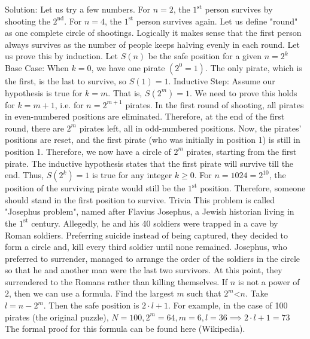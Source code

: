 \begin{enumerate}
Solution: Let us try a few numbers.
For $n=2$, the $1^{\text{st}}$ person survives by shooting the $2^{\text{nd}}$.
For $n=4$, the $1^{\text{st}}$ person survives again.
Let us define "round" as one complete circle of shootings. Logically it makes sense that the first person always survives as the number of people keeps halving evenly in each round. Let us prove this by induction.
Let $S(n)$ be the safe position for a given $n = 2^{k}$
Base Case: When $k = 0$, we have one pirate $(2^0 = 1)$. The only pirate, which is the first, is the last to survive, so $S(1) = 1$.
Inductive Step: Assume our hypothesis is true for $k = m$. That is, $S(2^m) = 1$.
We need to prove this holds for $k = m + 1$, i.e. for $n=2^{m+1}$ pirates.
In the first round of shooting, all pirates in even-numbered positions are eliminated. Therefore, at the end of the first round, there are $2^m$ pirates left, all in odd-numbered positions.
Now, the pirates' positions are reset, and the first pirate (who was initially in position 1) is still in position 1.
Therefore, we now have a circle of $2^m$ pirates, starting from the first pirate. The inductive hypothesis states that the first pirate will survive till the end.
Thus, $S(2^k) = 1$ is true for any integer $k\ge 0$.
For $n = 1024 = 2^{10}$, the position of the surviving pirate would still be the $1^{\text{st}}$ position. Therefore, someone should stand in the first position to survive.
Trivia
This problem is called "Josephus problem", named after Flavius Josephus, a Jewish historian living in the $1^{\text{st}}$ century. Allegedly, he and his 40 soldiers were trapped in a cave by Roman soldiers. Preferring suicide instead of being captured, they decided to form a circle and, kill every third soldier until none remained. Josephus, who preferred to surrender, managed to arrange the order of the soldiers in the circle so that he and another man were the last two survivors. At this point, they surrendered to the Romans rather than killing themselves.
If $n$ is not a power of $2$, then we can use a formula. Find the largest $m$ such that $2^m $<$ n$.
Take $l = n-2^m$.
Then the safe position is $2 \cdot l + 1$.
For example, in the case of 100 pirates (the original puzzle), $N=100, 2^m=64, m=6, l = 36 \implies 2 \cdot l + 1 = 73$
The formal proof for this formula can be found here (Wikipedia).





\end{enumerate}
